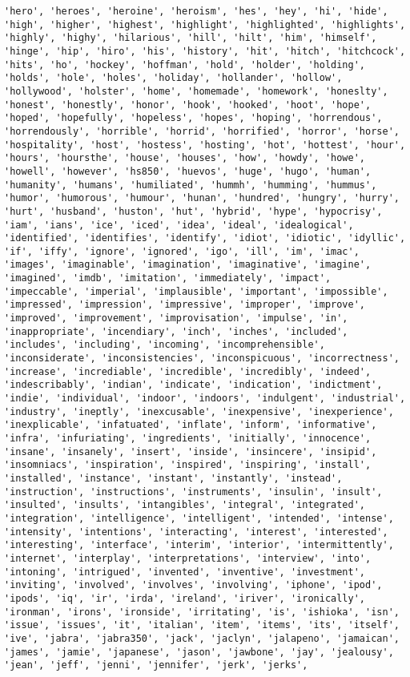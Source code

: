 \documentclass[11pt]{article}
\begin{document}
\begin{Verbatim}[commandchars=\\\{\}]
'hero', 'heroes', 'heroine', 'heroism', 'hes', 'hey', 'hi', 'hide', 'high', 'higher', 'highest', 'highlight', 'highlighted', 'highlights', 'highly', 'highy', 'hilarious', 'hill', 'hilt', 'him', 'himself', 'hinge', 'hip', 'hiro', 'his', 'history', 'hit', 'hitch', 'hitchcock', 'hits', 'ho', 'hockey', 'hoffman', 'hold', 'holder', 'holding', 'holds', 'hole', 'holes', 'holiday', 'hollander', 'hollow', 'hollywood', 'holster', 'home', 'homemade', 'homework', 'honeslty', 'honest', 'honestly', 'honor', 'hook', 'hooked', 'hoot', 'hope', 'hoped', 'hopefully', 'hopeless', 'hopes', 'hoping', 'horrendous', 'horrendously', 'horrible', 'horrid', 'horrified', 'horror', 'horse', 'hospitality', 'host', 'hostess', 'hosting', 'hot', 'hottest', 'hour', 'hours', 'hoursthe', 'house', 'houses', 'how', 'howdy', 'howe', 'howell', 'however', 'hs850', 'huevos', 'huge', 'hugo', 'human', 'humanity', 'humans', 'humiliated', 'hummh', 'humming', 'hummus', 'humor', 'humorous', 'humour', 'hunan', 'hundred', 'hungry', 'hurry', 'hurt', 'husband', 'huston', 'hut', 'hybrid', 'hype', 'hypocrisy', 'iam', 'ians', 'ice', 'iced', 'idea', 'ideal', 'idealogical', 'identified', 'identifies', 'identify', 'idiot', 'idiotic', 'idyllic', 'if', 'iffy', 'ignore', 'ignored', 'igo', 'ill', 'im', 'imac', 'images', 'imaginable', 'imagination', 'imaginative', 'imagine', 'imagined', 'imdb', 'imitation', 'immediately', 'impact', 'impeccable', 'imperial', 'implausible', 'important', 'impossible', 'impressed', 'impression', 'impressive', 'improper', 'improve', 'improved', 'improvement', 'improvisation', 'impulse', 'in', 'inappropriate', 'incendiary', 'inch', 'inches', 'included', 'includes', 'including', 'incoming', 'incomprehensible', 'inconsiderate', 'inconsistencies', 'inconspicuous', 'incorrectness', 'increase', 'incrediable', 'incredible', 'incredibly', 'indeed', 'indescribably', 'indian', 'indicate', 'indication', 'indictment', 'indie', 'individual', 'indoor', 'indoors', 'indulgent', 'industrial', 'industry', 'ineptly', 'inexcusable', 'inexpensive', 'inexperience', 'inexplicable', 'infatuated', 'inflate', 'inform', 'informative', 'infra', 'infuriating', 'ingredients', 'initially', 'innocence', 'insane', 'insanely', 'insert', 'inside', 'insincere', 'insipid', 'insomniacs', 'inspiration', 'inspired', 'inspiring', 'install', 'installed', 'instance', 'instant', 'instantly', 'instead', 'instruction', 'instructions', 'instruments', 'insulin', 'insult', 'insulted', 'insults', 'intangibles', 'integral', 'integrated', 'integration', 'intelligence', 'intelligent', 'intended', 'intense', 'intensity', 'intentions', 'interacting', 'interest', 'interested', 'interesting', 'interface', 'interim', 'interior', 'intermittently', 'internet', 'interplay', 'interpretations', 'interview', 'into', 'intoning', 'intrigued', 'invented', 'inventive', 'investment', 'inviting', 'involved', 'involves', 'involving', 'iphone', 'ipod', 'ipods', 'iq', 'ir', 'irda', 'ireland', 'iriver', 'ironically', 'ironman', 'irons', 'ironside', 'irritating', 'is', 'ishioka', 'isn', 'issue', 'issues', 'it', 'italian', 'item', 'items', 'its', 'itself', 'ive', 'jabra', 'jabra350', 'jack', 'jaclyn', 'jalapeno', 'jamaican', 'james', 'jamie', 'japanese', 'jason', 'jawbone', 'jay', 'jealousy', 'jean', 'jeff', 'jenni', 'jennifer', 'jerk', 'jerks', 
\end{Verbatim}
\end{document}

